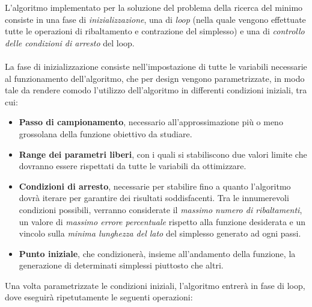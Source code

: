 \documentclass[a4paper, 11pt]{article}
\begin{document}
L'algoritmo implementato per la soluzione del problema della ricerca del minimo
consiste in una fase di \emph{inizializzazione}, una di \emph{loop} (nella quale vengono
effettuate tutte le operazioni di ribaltamento e contrazione del simplesso) e
una di \emph{controllo delle condizioni di arresto} del loop. \\ \\
La fase di inizializzazione consiste nell'impostazione di tutte le variabili
necessarie al funzionamento dell'algoritmo, che per design vengono
parametrizzate, in modo tale da rendere comodo l'utilizzo dell'algoritmo in
differenti condizioni iniziali, tra cui:
\begin{itemize}
\item \textbf{Passo di campionamento}, necessario all'approssimazione più o meno
grossolana della funzione obiettivo da studiare.
\item \textbf{Range dei parametri liberi}, con i quali si stabiliscono due
valori limite che dovranno essere rispettati da tutte le variabili da
ottimizzare.
\item \textbf{Condizioni di arresto}, necessarie per stabilire fino a quanto
l'algoritmo dovrà iterare per garantire dei risultati soddisfacenti. Tra le
innumerevoli condizioni possibili, verranno considerate il \emph{massimo numero
di ribaltamenti}, un valore di \emph{massimo errore percentuale} rispetto alla
funzione desiderata e un vincolo sulla \emph{minima lunghezza del lato} del
simplesso generato ad ogni passi.
\item \textbf{Punto iniziale}, che condizionerà, insieme all'andamento della
funzione, la generazione di determinati simplessi piuttosto che altri.
\end{itemize}

\noindent
Una volta parametrizzate le condizioni iniziali, l'algoritmo entrerà in fase di
loop, dove eseguirà ripetutamente le seguenti operazioni:
\end{document}
